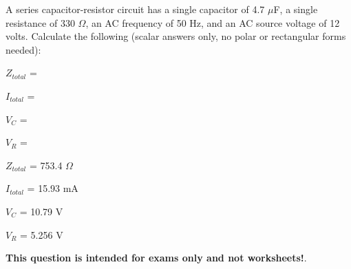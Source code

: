 

A series capacitor-resistor circuit has a single capacitor of 4.7 $\mu$F, a single resistance of 330 $\Omega$, an AC frequency of 50 Hz, and an AC source voltage of 12 volts.  Calculate the following (scalar answers only, no polar or rectangular forms needed):

\vskip 10pt

$Z_{total}$ =

\vskip 10pt

$I_{total}$ = 

\vskip 10pt

$V_{C}$ = 

\vskip 10pt

$V_{R}$ = 







$Z_{total}$ = 753.4 $\Omega$

\vskip 10pt

$I_{total}$ = 15.93 mA

\vskip 10pt

$V_{C}$ = 10.79 V

\vskip 10pt

$V_{R}$ = 5.256 V







{\bf This question is intended for exams only and not worksheets!}.



